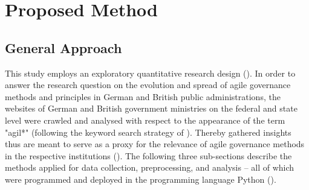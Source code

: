 








\section{Proposed Method}
\subsection{General Approach}
This study employs an exploratory quantitative research design (\cite{Olston2010, Jaeger1998}). In order to answer the research question on the evolution and spread of agile governance methods and principles in German and British public administrations, the websites of German and British government ministries on the federal and state level were crawled and analysed with respect to the appearance of the term "agil*" (following the keyword search strategy of \cite{Mergel2018}). Thereby gathered insights thus are meant to serve as a proxy for the relevance of agile governance methods in the respective institutions (\cite{Branco2006, Ghosh2013}). The following three sub-sections describe the methods applied for data collection, preprocessing, and analysis – all of which were programmed and deployed in the programming language Python (\cite{VanRossum1995}).
%
